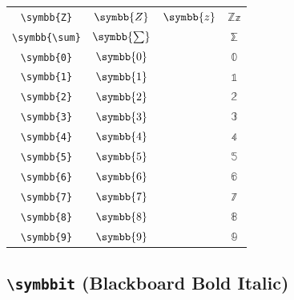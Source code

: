 \documentclass[12pt,a4paper]{article}
\begin{document}
\begin{longtable}{|c|c|c|c|}
\verb|\symbb{Z}| & $\symbb{Z}$ & $\symbb{z}$ & $ ℤ 𝕫 $ \\
\verb|\symbb{\sum}| & $\symbb{\sum}$ & & $ ⅀ $ \\
\verb|\symbb{0}| & $\symbb{0}$ & & $ 𝟘 $ \\
\verb|\symbb{1}| & $\symbb{1}$ & & $ 𝟙 $ \\
\verb|\symbb{2}| & $\symbb{2}$ & & $ 𝟚 $ \\
\verb|\symbb{3}| & $\symbb{3}$ & & $ 𝟛 $ \\
\verb|\symbb{4}| & $\symbb{4}$ & & $ 𝟜 $ \\
\verb|\symbb{5}| & $\symbb{5}$ & & $ 𝟝 $ \\
\verb|\symbb{6}| & $\symbb{6}$ & & $ 𝟞 $ \\
\verb|\symbb{7}| & $\symbb{7}$ & & $ 𝟟 $ \\
\verb|\symbb{8}| & $\symbb{8}$ & & $ 𝟠 $ \\
\verb|\symbb{9}| & $\symbb{9}$ & & $ 𝟡 $ \\
\hline
\end{longtable}

\newpage

\subsection*{\texttt{\textbackslash{}symbbit} (Blackboard Bold Italic)}
\end{document}
